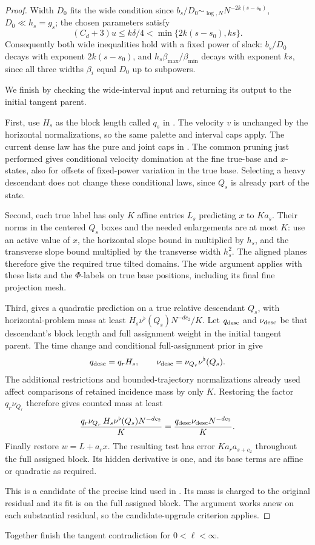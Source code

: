 \begin{proof}
Width \(D_0\) fits the wide condition since \(b_s/D_0\sim_{\log,N}N^{-2k(s-s_0)}\), \(D_0\ll h_s=g_s\); the chosen parameters satisfy
\[
 (C_d+3)u\le k\delta/4<\min\{2k(s-s_0),ks\}.
\]
Consequently both wide inequalities hold with a fixed power of
slack: \(b_s/D_0\) decays with exponent \(2k(s-s_0)\), and
\(h_s\beta_{\max}/\beta_{\min}\) decays with exponent \(ks\),
since all three widths \(\beta_i\) equal \(D_0\) up to
subpowers.

We finish by checking the wide-interval input and returning its
output to the initial tangent parent.

First, use \(H_s\) as the block length called \(q_s\) in
. The velocity \(v\) is unchanged by
the horizontal normalizations, so the same palette and interval
caps apply. The current dense law has the pure and joint caps in
. The common pruning just performed gives conditional velocity
domination at the fine true-base and \(x\)-states, also for offsets
of fixed-power variation in the true base. Selecting a heavy
descendant does not change these conditional laws, since \(Q_s\)
is already part of the state.

Second, each true label has only \(K\) affine entries \(L_s\)
predicting \(x\) to \(Ka_s\). Their norms in the centered
\(Q_s\) boxes and the needed enlargements are at most \(K\):
use an active value of \(x\), the horizontal slope bound in
 multiplied by \(h_s\), and the
transverse slope bound multiplied by the transverse width
\(h_s^2\). The aligned planes
therefore give the required true tilted domains. The wide argument
applies with these lists and the \(\Phi\)-labels on true base
positions, including its final fine projection mesh.

Third,  gives a quadratic prediction on a
true relative descendant \(Q_s\), with horizontal-problem mass
at least \(H_s\nu^\flat(Q_s)N^{-dc_2}/K\). Let
\(q_{\rm desc}\) and \(\nu_{\rm desc}\) be that descendant's
block length and full assignment weight in the initial tangent
parent. The time change and conditional full-assignment prior in
 give
\[
 q_{\rm desc}=q_rH_s,\qquad
 \nu_{\rm desc}=\nu_{Q_r}\nu^\flat(Q_s).
\]
The additional restrictions and bounded-trajectory normalizations
already used affect comparisons of retained incidence mass by only
\(K\). Restoring the factor \(q_r\nu_{Q_r}\) therefore gives
counted mass at least
\[
 \frac{q_r\nu_{Q_r}\,H_s\nu^\flat(Q_s)N^{-dc_2}}{K}
 =\frac{q_{\rm desc}\nu_{\rm desc}N^{-dc_2}}{K}.
\]
Finally restore \(w=L+a_rx\). The resulting test has error
\(Ka_ra_{s+c_2}\) throughout the full assigned block.
Its hidden derivative is one, and its base terms are affine or
quadratic as required.

This is a candidate of the precise kind used in
.  Its mass is charged to the original
residual and its fit is on the full assigned block.  The argument
works anew on each substantial residual, so the candidate-upgrade
criterion applies.
\end{proof}

Together  finish the
tangent contradiction for \(0<\ell<\infty\).
